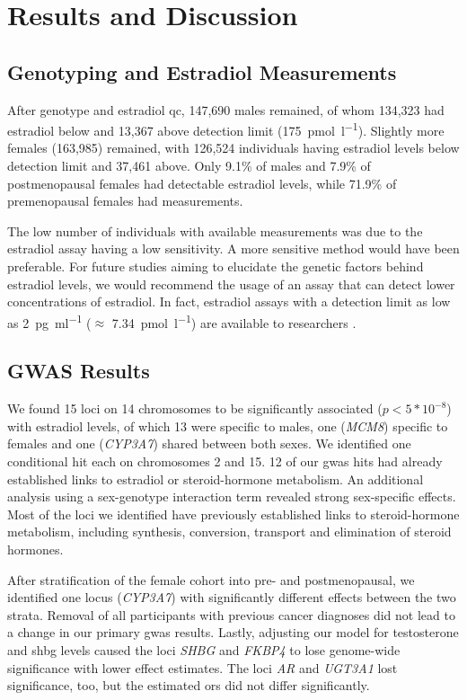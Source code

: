\documentclass[draft, twoside=false]{scrbook}
\begin{document}
\section{Results and Discussion}
\label{sec:p1discussion}
\subsection{Genotyping and Estradiol Measurements}
After genotype and estradiol \gls{qc}, 147,690 males remained, of whom 134,323 had estradiol below and 13,367 above detection limit (\qty{175}{\pmol\per\l}).
Slightly more females (163,985) remained, with 126,524 individuals having estradiol levels below detection limit and 37,461 above.
Only 9.1\% of males and 7.9\% of postmenopausal females had detectable estradiol levels, while 71.9\% of premenopausal females had measurements.

The low number of individuals with available measurements was due to the estradiol assay having a low sensitivity.
A more sensitive method would have been preferable.
For future studies aiming to elucidate the genetic factors behind estradiol levels, we would recommend the usage of an assay that can detect lower concentrations of estradiol.
In fact, estradiol assays with a detection limit as low as \qty{2}{\pg\per\ml} ($\approx$ \qty{7.34}{\pmol\per\l}) are available to researchers \cite{Travison2014}.

\subsection{GWAS Results}
We found 15 loci on 14 chromosomes to be significantly associated ($p < 5*10^{-8}$) with estradiol levels, of which 13 were specific to males, one (\textit{MCM8}) specific to females and one (\textit{CYP3A7}) shared between both sexes.
We identified one conditional hit each on chromosomes 2 and 15.
12 of our \gls{gwas} hits had already established links to estradiol or steroid-hormone metabolism.
An additional analysis using a sex-genotype interaction term revealed strong sex-specific effects.
Most of the loci we identified have previously established links to steroid-hormone metabolism, including synthesis, conversion, transport and elimination of steroid hormones.

After stratification of the female cohort into pre- and postmenopausal, we identified one locus (\textit{CYP3A7}) with significantly different effects between the two strata.
Removal of all participants with previous cancer diagnoses did not lead to a change in our primary \gls{gwas} results.
Lastly, adjusting our model for testosterone and \gls{shbg} levels caused the loci \textit{SHBG} and \textit{FKBP4} to lose genome-wide significance with lower effect estimates.
The loci \textit{AR} and \textit{UGT3A1} lost significance, too, but the estimated \glspl{or} did not differ significantly.
\end{document}
